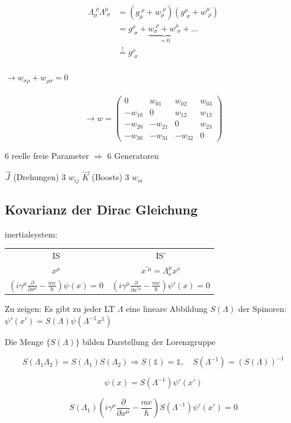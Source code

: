 \begin{align}
\Lambda^{\,\,\rho}_{\mu}\Lambda^\mu_{\,\,\sigma}  &= (g_\mu^{\,\,\rho}+w_\mu^{\,\,\rho})(g^\mu_{\,\,\sigma}+w^\mu_{\,\,\rho}) \\
&= g^\rho_{\,\,\sigma}+\underbrace{w_\sigma^{\,\,\rho}+w^\rho_{\,\,\sigma}}_{=0}+... \\
& \stackrel{\mathrm{!}}= g^\rho_{\,\,\sigma}
\end{align}
\\
\(\rightarrow w_{\sigma\rho}+w_{\rho\sigma}=0\)\\
\\
 \[ \rightarrow  w = \begin{pmatrix}0&w_{01}&w_{02}&w_{03}\\ -w_{10}&0&w_{12}&w_{13}\\-w_{20}&-w_{21}&0&w_{23}\\ -w_{30}&-w_{31}&-w_{32}&0\end{pmatrix} \]


6 reelle freie Parameter  \(\Rightarrow \) 6 Generatoren

\(\vec J\) (Drehungen) 3 \(w_{ij}\)
\(\vec K\) (Boosts) 3 \(w_{oi}\)


\subsection{Kovarianz der Dirac Gleichung}

inertialsystem:

\begin{tabular}{cc}
  IS&IS'\\
\(x^\mu\)& \(x^{'\mu}=\Lambda^\mu_\nu x^\nu\)\\
\((i\gamma^\mu\frac{\partial}{\partial x^\mu}-\frac{mc}{\hbar})\psi(x) = 0\)&\((i\gamma^\mu\frac{\partial}{\partial x^{'\mu}}-\frac{mc}{\hbar})\psi'(x) = 0\)
\end{tabular}

Zu zeigen: Es gibt zu jeder LT \(\Lambda\) eine lineare Abbildung \(S(\Lambda)\) der Spinoren: \(\psi'(x')=S(\Lambda)\psi(\Lambda^{-1}x^1)\)

Die Menge \(\{S(\Lambda)\}\) bilden Darstellung der Lorenzgruppe

\[S(\Lambda_1\Lambda_2) = S(\Lambda_1)S(\Lambda_2) \Rightarrow S(\mathbb 1) = \mathbb 1, \quad S(\Lambda^{-1})=(S(\Lambda))^{-1}\]

\[\psi(x) = S(\Lambda^{-1})\psi'(x') \]



\[S(\Lambda_1)  (i\gamma^\mu\frac{\partial}{\partial x^\mu}-\frac{mc}{\hbar})S(\Lambda^{-1}) \psi'(x') = 0\]


